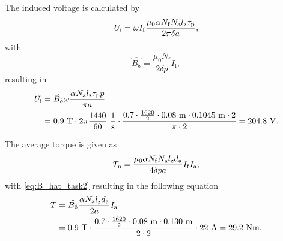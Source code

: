 
\begin{solutionblock}
    The induced voltage is calculated by
    \begin{equation}
        U_{\mathrm{i}} = \omega I_{\mathrm{f}} \frac{\mu_{\mathrm{0}} \alpha N_{\mathrm{f}} N_{\mathrm{a}} \lz \taup}{2 \pi \delta a},
    \end{equation}
    with
    \begin{equation}
        \hat{B_{\updelta}} = \frac{\mu_{\mathrm{0}} N_{\mathrm{f}}}{2 \delta p} I_{\mathrm{f}},
        \label{eq:B_hat_task2}
    \end{equation}
    resulting in
    \begin{align}
        \begin{split}
            U_{\mathrm{i}} &= \hat{B_{\updelta}} \omega \frac{\alpha N_{\mathrm{a}} \lz \taup p}{\pi a}\\
            &= 0.9 \ \si{T} \cdot 2\pi \frac{1440}{60} \ \si{\frac{1}{s}} \cdot \frac{0.7 \cdot \frac{1620}{2} \cdot 0.08 \ \si{m} \cdot 0.1045 \ \si{m} \cdot 2}{\pi \cdot 2}
            = 204.8 \ \si{V}.
        \end{split}
    \end{align}

    The average torque is given as
    \begin{equation}
        \Tn
        = \frac{\mu_{\mathrm{0}} \alpha N_{\mathrm{f}} N_{\mathrm{a}} \lz d_{\mathrm{a}}}{4 \delta p a} I_{\mathrm{f}} I_{\mathrm{a}},
    \end{equation}
    with \eqref{eq:B_hat_task2} resulting in the following equation
    \begin{align}
        \begin{split}
            T &= \hat{B_{\updelta}} \frac{\alpha N_{\mathrm{a}} \lz d_{\mathrm{a}}}{2a} \Ia\\
            &= 0.9 \ \si{T} \cdot \frac{0.7 \cdot \frac{1620}{2} \cdot 0.08 \ \si{m} \cdot 0.130 \ \si{m}}{2 \cdot 2} \cdot 22 \ \si{A}
            = 29.2 \ \si{Nm}.
        \end{split}
    \end{align}


\end{solutionblock}
